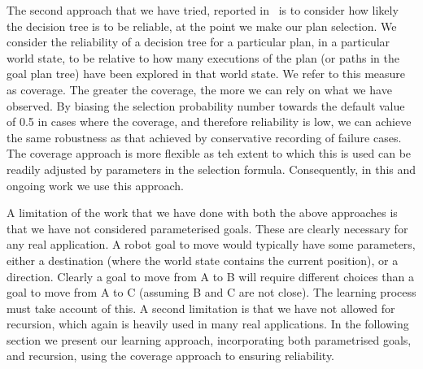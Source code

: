 The second approach that we have tried, reported in~\cite{aamas} is to
consider how likely the decision tree is to be reliable, at the point
we make our plan selection.  We consider the reliability of a decision
tree for a particular plan, in a particular world state, to be
relative to how many executions of the plan (or paths in the goal plan
tree) have been explored in that world state. We refer to this measure
as coverage. The greater the coverage, the more we can rely on what we
have observed.  By biasing the selection probability number towards
the default value of 0.5 in cases where the coverage, and therefore
reliability is low, we can achieve the same robustness as that
achieved by conservative recording of failure cases. The coverage
approach is more flexible as teh extent to which this is used can be
readily adjusted by parameters in the selection formula. Consequently,
in this and ongoing work we use this approach.

A limitation of the work that we have done with both the above
approaches is that we have not considered parameterised goals. These
are clearly necessary for any real application.  A robot goal to move
would typically have some parameters, either a destination (where the
world state contains the current position), or a direction. Clearly a
goal to move from A to B will require different choices than a goal to
move from A to C (assuming B and C are not close). The learning
process must take account of this.  A second limitation is that we
have not allowed for recursion, which again is heavily used in many
real applications. In the following section we present our learning
approach, incorporating both parametrised goals, and recursion, using
the coverage approach to ensuring reliability.
